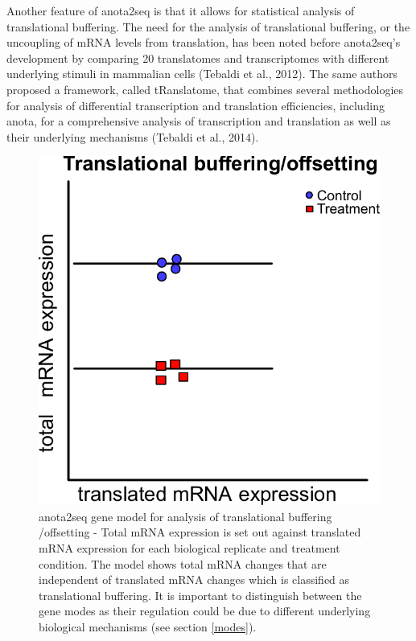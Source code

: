 \documentclass[12pt,openany]{book}
\begin{document}
Another feature of anota2seq is that it allows for statistical analysis
of translational buffering. The need for the analysis of translational
buffering, or the uncoupling of mRNA levels from translation, has been
noted before anota2seq's development by comparing 20 translatomes and
transcriptomes with different underlying stimuli in mammalian cells
(Tebaldi et al., 2012). The same authors proposed a framework, called
tRanslatome, that combines several methodologies for analysis of
differential transcription and translation efficiencies, including
anota, for a comprehensive analysis of transcription and translation as
well as their underlying mechanisms (Tebaldi et al., 2014).

\begin{figure}
  \includegraphics{./figures/geneModes_anota2seq.pdf}
  \caption{anota2seq gene model for analysis of translational buffering /offsetting - Total mRNA expression is set out against translated mRNA expression for each biological replicate and treatment condition. The model shows total mRNA changes that are independent of translated mRNA changes which is classified as translational buffering. It is important to distinguish between the gene modes as their regulation could be due to different underlying biological mechanisms (see section \ref{modes}).
  \label{fig:anota2seq}}
\end{figure}
\end{document}
